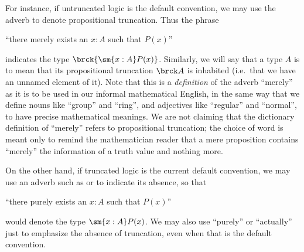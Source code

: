 For instance, if untruncated logic is the default convention, we may use the adverb 
%
to denote propositional truncation.
Thus the phrase
\begin{center}
  ``there merely exists an $x:A$ such that $P(x)$''
\end{center}
indicates the type $\brck{\sm{x:A} P(x)}$.
Similarly, we will say that a type $A$ is 
%
%
to mean that its propositional truncation $\brck A$ is inhabited (i.e.\ that we have an unnamed element of it).
Note that this is a \emph{definition} of the adverb ``merely'' as it is to be used in our informal mathematical English, in the same way that we define nouns like ``group'' and ``ring'', and adjectives like ``regular'' and ``normal'', to have precise mathematical meanings.
We are not claiming that the dictionary definition of ``merely'' refers to propositional truncation; the choice of word is meant only to remind the mathematician reader that a mere proposition contains ``merely'' the information of a truth value and nothing more.

On the other hand, if truncated logic is the current default convention, we may use an adverb such as 
%
or  to indicate its absence, so that
\begin{center}
``there purely exists an $x:A$ such that $P(x)$''
\end{center}
would denote the type $\sm{x:A} P(x)$.
We may also use ``purely'' or ``actually'' just to emphasize the absence of truncation, even when that is the default convention.

